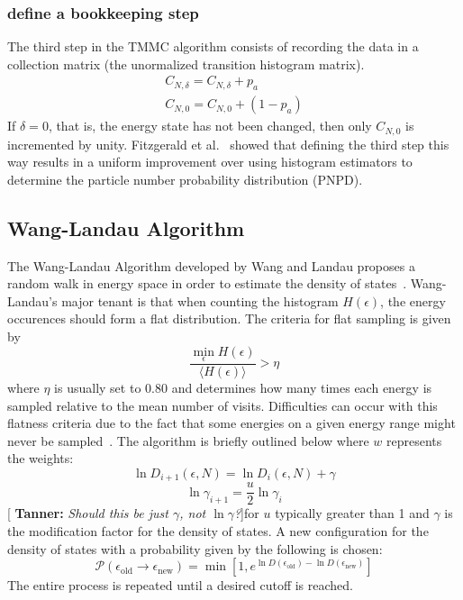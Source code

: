 \documentclass[letterpaper,twocolumn,amsmath,amssymb,pre,aps,10pt]{revtex4-1}
\newcommand{\cyan}[1]{{\bf \color{cyan} #1}}
\newcommand{\tssays}[1]{{\color{red} [\cyan{Tanner:} \emph{#1}]}}
\begin{document}
\subsubsection{define a bookkeeping step}
The third step in the TMMC algorithm consists of recording the data in
a collection matrix (the unormalized transition histogram matrix).
\begin{align}
  C_{N,\delta} = C_{N,\delta} + p_{a}\\
  C_{N,0} = C_{N,0} +(1 - p_{a})
\end{align} If $\delta=0$, that is, the energy state has not been
changed, then only $C_{N,0}$ is incremented by unity. Fitzgerald et
al.~\cite{fitzgerald2000monte} showed that defining the third step this
way results in a uniform improvement over using histogram estimators to
determine the particle number probability distribution (PNPD).

\subsection{Wang-Landau Algorithm}

The Wang-Landau Algorithm developed by Wang and Landau proposes a
random walk in energy space in order to estimate the density of
states~\cite{wang2001efficient,wang2001determining, landau2014guide}.
Wang-Landau's major tenant is that when counting the histogram
$H(\epsilon)$, the energy occurences should form a flat distribution.
The criteria for flat sampling is given by
\begin{equation}
	\frac{\min_{\epsilon} H(\epsilon)}
	{\big\langle H(\epsilon)\big\rangle }
	> \eta
\end{equation}
where $\eta$ is usually set to $0.80$ and determines how many times
each energy is sampled relative to the mean number of visits.
Difficulties can occur with this flatness criteria due to the fact that
some energies on a given energy range might never be
sampled~\cite{haber2014transition}. The algorithm is briefly outlined
below where $w$ represents the weights:
\begin{equation}
	\ln{D_{i+1}(\epsilon,N)}=\ln{D_{i}(\epsilon,N)}
	+\gamma
\end{equation}
\begin{equation}
	\ln{\gamma_{i+1}}=\frac{u}{2}\ln{\gamma_{i}}
\end{equation}
\tssays{Should this be just $\gamma$, not $\ln{\gamma}$?}for $u$ typically 
greater than 1 and $\gamma$ is the modification factor for the density of 
states.  A new configuration for the density of states with a probability 
given by the following is chosen:
\begin{equation}
	\mathcal{P}(\epsilon_\text{old} \rightarrow \epsilon_\text{new})
	= \min[1,e^{\ln{D(\epsilon_\text{old})}-\ln{D(\epsilon_\text{new})}}]
\end{equation}
The entire process is repeated until a desired cutoff is reached.
\end{document}
